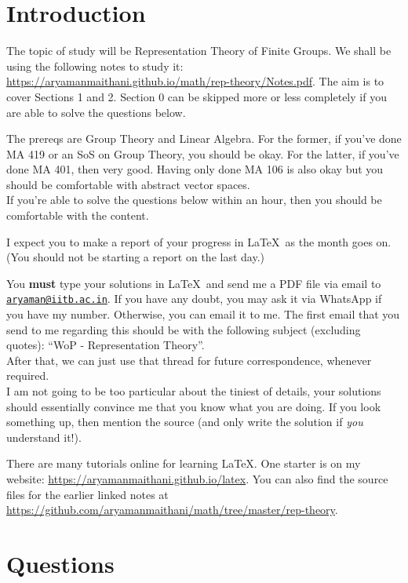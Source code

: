 \documentclass[12pt]{article}
\makeatletter
\newcommand{\myemail}{aryaman@iitb.ac.in}
\makeatother
\begin{document}
\section{Introduction}

The topic of study will be Representation Theory of Finite Groups. We shall be using the following notes to study it: \url{https://aryamanmaithani.github.io/math/rep-theory/Notes.pdf}. The aim is to cover Sections 1 and 2. Section 0 can be skipped more or less completely if you are able to solve the questions below. 

The prereqs are Group Theory and Linear Algebra. For the former, if you've done MA 419 or an SoS on Group Theory, you should be okay. For the latter, if you've done MA 401, then very good. Having only done MA 106 is also okay but you should be comfortable with abstract vector spaces. \\
If you're able to solve the questions below within an hour, then you should be comfortable with the content.

I expect you to make a report of your progress in \LaTeX\ as the month goes on. (You should not be starting a report on the last day.)

You \textbf{must} type your solutions in \LaTeX\ and send me a PDF file via email to \href{mailto:\myemail}{\texttt{\myemail}}. If you have any doubt, you may ask it via WhatsApp if you have my number. Otherwise, you can email it to me. The first email that you send to me regarding this should be with the following subject (excluding quotes): ``WoP - Representation Theory''. \\
After that, we can just use that thread for future correspondence, whenever required. \\
I am not going to be too particular about the tiniest of details, your solutions should essentially convince me that you know what you are doing. If you look something up, then mention the source (and only write the solution if \emph{you} understand it!).

There are many tutorials online for learning \LaTeX. One starter is on my website: \url{https://aryamanmaithani.github.io/latex}. You can also find the source files for the earlier linked notes at \url{https://github.com/aryamanmaithani/math/tree/master/rep-theory}.

\section{Questions}
\end{document}

